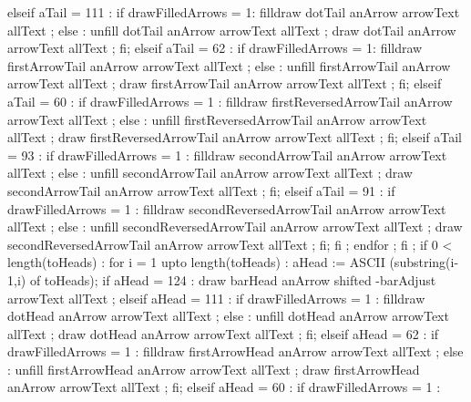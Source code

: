         elseif aTail = 111 : %
          if drawFilledArrows = 1:
            filldraw dotTail anArrow arrowText allText ;
          else :
            unfill dotTail anArrow arrowText allText ;
            draw dotTail anArrow arrowText allText ;
          fi;
        elseif aTail = 62 : %
          if drawFilledArrows = 1:
            filldraw firstArrowTail
              anArrow arrowText allText ;
          else :
            unfill firstArrowTail
              anArrow arrowText allText ;
            draw firstArrowTail
              anArrow arrowText allText ;
          fi;
        elseif aTail = 60 : %
          if drawFilledArrows = 1 :
            filldraw firstReversedArrowTail
              anArrow arrowText allText ;
          else :
            unfill firstReversedArrowTail
              anArrow arrowText allText ;
            draw firstReversedArrowTail
              anArrow arrowText allText ;
          fi;
        elseif aTail = 93 : %
          if drawFilledArrows = 1 :
            filldraw secondArrowTail
              anArrow arrowText allText ;
          else :
            unfill secondArrowTail
              anArrow arrowText allText ;
            draw secondArrowTail
              anArrow arrowText allText ;
          fi;
        elseif aTail = 91 : %
          if drawFilledArrows = 1 :
            filldraw secondReversedArrowTail
              anArrow arrowText allText ;
          else :
            unfill secondReversedArrowTail
              anArrow arrowText allText ;
            draw secondReversedArrowTail
              anArrow arrowText allText ;
          fi;
        fi ;
      endfor ;
    fi ;
    if 0 < length(toHeads) :
      for i = 1 upto length(toHeads) :
        aHead := ASCII (substring(i-1,i) of toHeads);
        if aHead = 124 : %
          draw barHead anArrow
            shifted -barAdjust
            arrowText allText ;
        elseif aHead = 111 : %
          if drawFilledArrows = 1 :
            filldraw dotHead anArrow
              arrowText allText ;
          else :
            unfill dotHead anArrow
              arrowText allText ;
            draw dotHead anArrow
              arrowText allText ;
          fi;
        elseif aHead = 62 : %
          if drawFilledArrows = 1 :
            filldraw firstArrowHead
              anArrow arrowText allText ;
          else :
            unfill firstArrowHead
              anArrow arrowText allText ;
            draw firstArrowHead
              anArrow arrowText allText ;
          fi;
        elseif aHead = 60 : %
          if drawFilledArrows = 1 :
